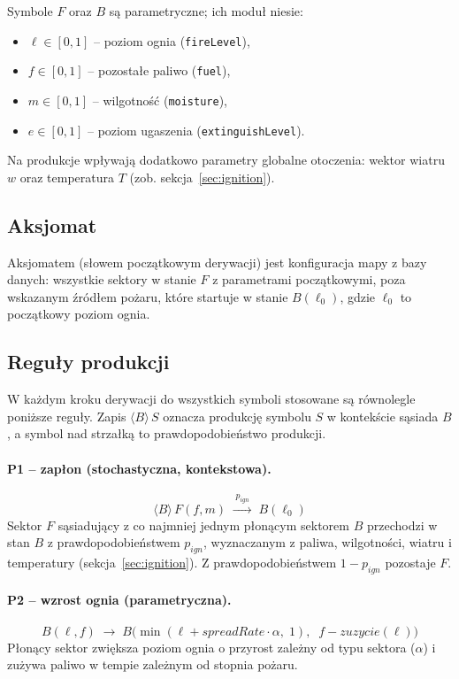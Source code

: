\documentclass[11pt,a4paper]{article}
\begin{document}
Symbole $F$ oraz $B$ są parametryczne; ich moduł niesie:
\begin{itemize}
  \item $\ell \in [0,1]$ -- poziom ognia (\texttt{fireLevel}),
  \item $f \in [0,1]$ -- pozostałe paliwo (\texttt{fuel}),
  \item $m \in [0,1]$ -- wilgotność (\texttt{moisture}),
  \item $e \in [0,1]$ -- poziom ugaszenia (\texttt{extinguishLevel}).
\end{itemize}
Na produkcje wpływają dodatkowo parametry globalne otoczenia: wektor wiatru $w$ oraz temperatura $T$ (zob. sekcja~\ref{sec:ignition}).

\subsection{Aksjomat}

Aksjomatem (słowem początkowym derywacji) jest konfiguracja mapy z bazy danych: wszystkie sektory w stanie $F$ z parametrami początkowymi, poza wskazanym źródłem pożaru, które startuje w stanie $B(\ell_0)$, gdzie $\ell_0$ to początkowy poziom ognia.

\subsection{Reguły produkcji}

W każdym kroku derywacji do wszystkich symboli stosowane są równolegle poniższe reguły. Zapis $\langle B \rangle\, S$ oznacza produkcję symbolu $S$ w kontekście sąsiada $B$, a symbol nad strzałką to prawdopodobieństwo produkcji.

\paragraph{P1 -- zapłon (stochastyczna, kontekstowa).}
\begin{equation}
\langle B \rangle\, F(f,m) \;\xrightarrow{\;p_{ign}\;}\; B(\ell_0)
\end{equation}
Sektor $F$ sąsiadujący z co najmniej jednym płonącym sektorem $B$ przechodzi w stan $B$ z prawdopodobieństwem $p_{ign}$, wyznaczanym z paliwa, wilgotności, wiatru i temperatury (sekcja~\ref{sec:ignition}). Z prawdopodobieństwem $1 - p_{ign}$ pozostaje $F$.

\paragraph{P2 -- wzrost ognia (parametryczna).}
\begin{equation}
B(\ell, f) \;\rightarrow\; B\Big(\min(\ell + spreadRate\cdot\alpha,\; 1),\;\; f - \mathit{zuzycie}(\ell)\Big)
\end{equation}
Płonący sektor zwiększa poziom ognia o przyrost zależny od typu sektora ($\alpha$) i zużywa paliwo w tempie zależnym od stopnia pożaru.
\end{document}

